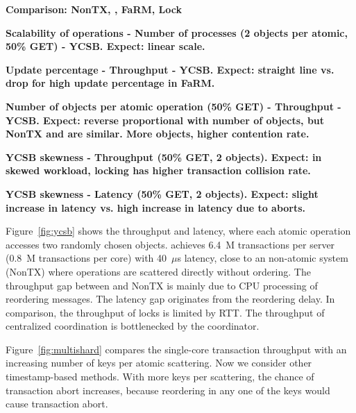 \textbf{Comparison: NonTX, \sys{}, FaRM, Lock}

\textbf{Scalability of operations - Number of processes (2 objects per atomic, 50\% GET) - YCSB. Expect: linear scale.}

\textbf{Update percentage - Throughput - YCSB. Expect: straight line vs. drop for high update percentage in FaRM.}

\textbf{Number of objects per atomic operation (50\% GET) - Throughput - YCSB. Expect: reverse proportional with number of objects, but NonTX and \sys{} are similar. More objects, higher contention rate.}

\textbf{YCSB skewness - Throughput (50\% GET, 2 objects). Expect: in skewed workload, locking has higher transaction collision rate.}

\textbf{YCSB skewness - Latency (50\% GET, 2 objects). Expect: slight increase in latency vs. high increase in latency due to aborts.}


Figure~\ref{fig:ycsb} shows the throughput and latency, where each atomic operation accesses two randomly chosen objects.
\sys achieves 6.4~M transactions per server (0.8~M transactions per core) with 40~$\mu$s latency, close to an non-atomic system (NonTX) where operations are scattered directly without ordering.
The throughput gap between \sys and NonTX is mainly due to CPU processing of reordering messages.
The latency gap originates from the reordering delay.
In comparison, the throughput of locks is limited by RTT.
The throughput of centralized coordination is bottlenecked by the coordinator.

Figure~\ref{fig:multishard} compares the single-core transaction throughput with an increasing number of keys per atomic scattering.
Now we consider other timestamp-based methods.
With more keys per scattering, the chance of transaction abort increases, because reordering in any one of the keys would cause transaction abort.

